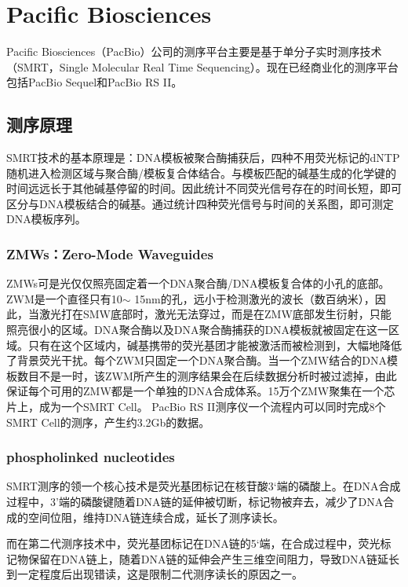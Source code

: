 \chapter{Pacific Biosciences}

Pacific Biosciences（PacBio\textregistered）公司的测序平台主要是基于单分子实时测序技术（SMRT，Single Molecular Real Time Sequencing）。现在已经商业化的测序平台包括PacBio Sequel和PacBio RS II。

\section{测序原理}



SMRT技术的基本原理是：DNA模板被聚合酶捕获后，四种不用荧光标记的dNTP随机进入检测区域与聚合酶/模板复合体结合。与模板匹配的碱基生成的化学键的时间远远长于其他碱基停留的时间。因此统计不同荧光信号存在的时间长短，即可区分与DNA模板结合的碱基。通过统计四种荧光信号与时间的关系图，即可测定DNA模板序列。

\subsection{ZMWs：Zero-Mode Waveguides}

ZMWs可是光仅仅照亮固定着一个DNA聚合酶/DNA模板复合体的小孔的底部。ZWM是一个直径只有10$ \sim $ 15nm的孔，远小于检测激光的波长（数百纳米），因此，当激光打在SMW底部时，激光无法穿过，而是在ZMW底部发生衍射，只能照亮很小的区域。DNA聚合酶以及DNA聚合酶捕获的DNA模板就被固定在这一区域。只有在这个区域内，碱基携带的荧光基团才能被激活而被检测到，大幅地降低了背景荧光干扰。每个ZWM只固定一个DNA聚合酶。当一个ZMW结合的DNA模板数目不是一时，该ZWM所产生的测序结果会在后续数据分析时被过滤掉，由此保证每个可用的ZMW都是一个单独的DNA合成体系。15万个ZMW聚集在一个芯片上，成为一个SMRT Cell。 PacBio RS II测序仪一个流程内可以同时完成8个SMRT Cell的测序，产生约3.2Gb的数据。

\subsection{phospholinked nucleotides}
SMRT测序的领一个核心技术是荧光基团标记在核苷酸3‘端的磷酸上。在DNA合成过程中，3’端的磷酸键随着DNA链的延伸被切断，标记物被弃去，减少了DNA合成的空间位阻，维持DNA链连续合成，延长了测序读长。

而在第二代测序技术中，荧光基团标记在DNA链的5‘端，在合成过程中，荧光标记物保留在DNA链上，随着DNA链的延伸会产生三维空间阻力，导致DNA链延长到一定程度后出现错读，这是限制二代测序读长的原因之一。

